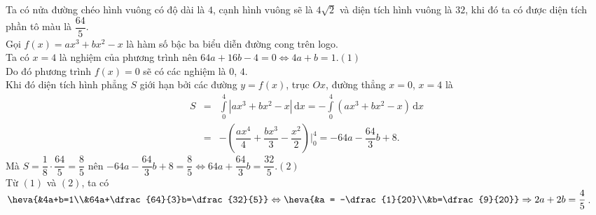 \begin{ex}%
{
}
\par
{}
\loigiai
{
Ta có nửa đường chéo hình vuông có độ dài là $4$, cạnh hình vuông sẽ là $4\sqrt{2}$ và diện tích hình vuông là $32$, khi đó ta có được diện tích phần tô màu là $\dfrac{64}{5}$.\\
Gọi $f(x) = ax^3 + bx^2 - x$ là hàm số bậc ba biểu diễn đường cong trên logo.\\
Ta có $x = 4$ là nghiệm của phương trình nên $64a + 16b - 4 = 0 \Leftrightarrow 4a+b=1$.\quad $(1)$\\
Do đó phương trình $f(x) = 0$ sẽ có các nghiệm là $0$, $4$.\\
Khi đó diện tích hình phẳng $S$ giới hạn bởi các đường $y = f(x)$, trục $Ox$, đường thẳng $x = 0$, $x = 4$ là
\allowdisplaybreaks
\begin{eqnarray*}
S&= & \displaystyle \int \limits_{0}^{4} \left|ax^3+bx^2-x\right|\mathrm{\,d}x = -\displaystyle \int \limits_{0}^{4} \left(ax^3+bx^2-x\right)\mathrm{\,d}x\\
&= & -\left(\dfrac{ax^4}{4}+\dfrac{bx^3}{3}-\dfrac{x^2}{2}\right)\Bigg|_0^4 = -64a-\dfrac{64}{3}b+8.
\end{eqnarray*}
Mà $S = \dfrac{1}{8}\cdot \dfrac{64}{5} = \dfrac{8}{5}$ nên $-64a-\dfrac{64}{3}b+8 = \dfrac{8}{5} \Leftrightarrow 64a+\dfrac{64}{3}b=\dfrac{32}{5}$.\quad $(2)$\\
Từ $(1)$ và $(2)$, ta có $\heva{&4a+b=1\\&64a+\dfrac{64}{3}b=\dfrac{32}{5}} \Leftrightarrow \heva{&a = -\dfrac{1}{20}\\&b=\dfrac{9}{20}} \Rightarrow 2a+2b = \dfrac{4}{5}$.
}
\end{ex}


